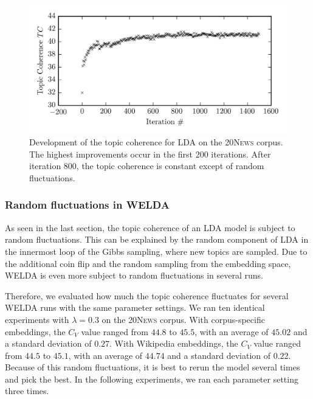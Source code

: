 \documentclass[
        a4paper,
        titlepage,
        twoside,
        parskip,
        numbers=noenddot
        ]{scrbook}
\theoremstyle{break}
\begin{document}
\begin{figure}
       \centering
       \includegraphics[width=12cm]{figures/lda_20news_tc_development.png}
       \caption{Development of the topic coherence for LDA on the \textsc{20News} corpus. The highest improvements occur in the first 200 iterations. After iteration 800, the topic coherence is constant except of random fluctuations.}
       \label{fig:lda_20news_tc_development}
\end{figure}

\subsubsection{Random fluctuations in WELDA}

As seen in the last section, the topic coherence of an LDA model is subject to random fluctuations.
This can be explained by the random component of LDA in the innermost loop of the Gibbs sampling, where new topics are sampled.
Due to the additional coin flip and the random sampling from the embedding space, WELDA is even more subject to random fluctuations in several runs.

Therefore, we evaluated how much the topic coherence fluctuates for several WELDA runs with the same parameter settings.
We ran ten identical experiments with $\lambda = 0.3$ on the \textsc{20News} corpus.
With corpus-specific embeddings, the $C_V$ value ranged from $44.8$ to $45.5$, with an average of $45.02$ and a standard deviation of $0.27$.
With Wikipedia embeddings, the $C_V$ value ranged from $44.5$ to $45.1$, with an average of $44.74$ and a standard deviation of $0.22$.
Because of this random fluctuations, it is best to rerun the model several times and pick the best.
In the following experiments, we ran each parameter setting three times.
\end{document}
